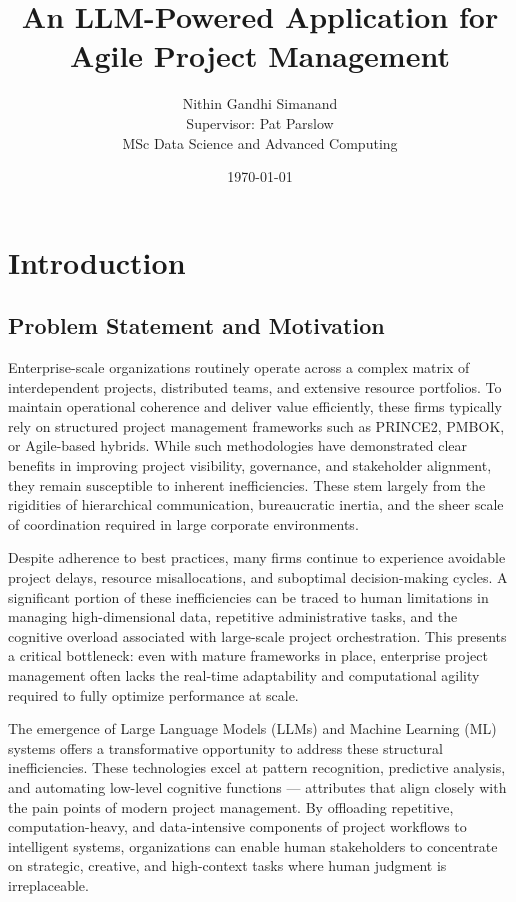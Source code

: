\documentclass[12pt,a4paper]{report}
\title{\textbf{An LLM-Powered Application for Agile Project Management}}
\author{Nithin Gandhi Simanand \\ Supervisor: Pat Parslow \\ MSc Data Science and Advanced Computing}
\date{\today}
\begin{document}
\maketitle

\tableofcontents
\newpage

\chapter{Introduction}  %
\section{Problem Statement and Motivation}
Enterprise-scale organizations routinely operate across a complex matrix of interdependent projects, distributed teams, and extensive resource portfolios. To maintain operational coherence and deliver value efficiently, these firms typically rely on structured project management frameworks such as PRINCE2, PMBOK, or Agile-based hybrids. While such methodologies have demonstrated clear benefits in improving project visibility, governance, and stakeholder alignment, they remain susceptible to inherent inefficiencies. These stem largely from the rigidities of hierarchical communication, bureaucratic inertia, and the sheer scale of coordination required in large corporate environments.

Despite adherence to best practices, many firms continue to experience avoidable project delays, resource misallocations, and suboptimal decision-making cycles. A significant portion of these inefficiencies can be traced to human limitations in managing high-dimensional data, repetitive administrative tasks, and the cognitive overload associated with large-scale project orchestration. This presents a critical bottleneck: even with mature frameworks in place, enterprise project management often lacks the real-time adaptability and computational agility required to fully optimize performance at scale.

The emergence of Large Language Models (LLMs) and Machine Learning (ML) systems offers a transformative opportunity to address these structural inefficiencies. These technologies excel at pattern recognition, predictive analysis, and automating low-level cognitive functions — attributes that align closely with the pain points of modern project management. By offloading repetitive, computation-heavy, and data-intensive components of project workflows to intelligent systems, organizations can enable human stakeholders to concentrate on strategic, creative, and high-context tasks where human judgment is irreplaceable.
\end{document}
